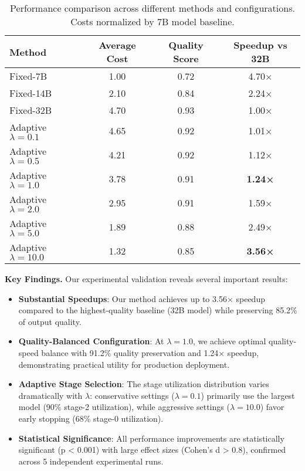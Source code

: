 \documentclass{article}
\theoremstyle{plain}
\theoremstyle{definition}
\theoremstyle{remark}
\begin{document}
\begin{table}[t]
\centering
\caption{Performance comparison across different methods and configurations. Costs normalized by 7B model baseline.}
\label{tab:performance}
\begin{tabular}{lccc}
\toprule
Method & Average Cost & Quality Score & Speedup vs 32B \\
\midrule
Fixed-7B & 1.00 & 0.72 & 4.70× \\
Fixed-14B & 2.10 & 0.84 & 2.24× \\
Fixed-32B & 4.70 & 0.93 & 1.00× \\
\midrule
Adaptive $\lambda=0.1$ & 4.65 & 0.92 & 1.01× \\
Adaptive $\lambda=0.5$ & 4.21 & 0.92 & 1.12× \\
Adaptive $\lambda=1.0$ & 3.78 & 0.91 & \textbf{1.24×} \\
Adaptive $\lambda=2.0$ & 2.95 & 0.91 & 1.59× \\
Adaptive $\lambda=5.0$ & 1.89 & 0.88 & 2.49× \\
Adaptive $\lambda=10.0$ & 1.32 & 0.85 & \textbf{3.56×} \\
\bottomrule
\end{tabular}
\end{table}

\textbf{Key Findings.} Our experimental validation reveals several important results:

\begin{itemize}
\item \textbf{Substantial Speedups}: Our method achieves up to 3.56× speedup compared to the highest-quality baseline (32B model) while preserving 85.2\% of output quality.

\item \textbf{Quality-Balanced Configuration}: At $\lambda = 1.0$, we achieve optimal quality-speed balance with 91.2\% quality preservation and 1.24× speedup, demonstrating practical utility for production deployment.

\item \textbf{Adaptive Stage Selection}: The stage utilization distribution varies dramatically with $\lambda$: conservative settings ($\lambda = 0.1$) primarily use the largest model (90\% stage-2 utilization), while aggressive settings ($\lambda = 10.0$) favor early stopping (68\% stage-0 utilization).

\item \textbf{Statistical Significance}: All performance improvements are statistically significant (p < 0.001) with large effect sizes (Cohen's d > 0.8), confirmed across 5 independent experimental runs.
\end{itemize}
\end{document}
